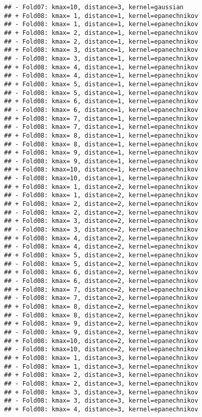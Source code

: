 \documentclass[
]{article}
\begin{document}
\begin{verbatim}
## - Fold07: kmax=10, distance=3, kernel=gaussian 
## + Fold08: kmax= 1, distance=1, kernel=epanechnikov 
## - Fold08: kmax= 1, distance=1, kernel=epanechnikov 
## + Fold08: kmax= 2, distance=1, kernel=epanechnikov 
## - Fold08: kmax= 2, distance=1, kernel=epanechnikov 
## + Fold08: kmax= 3, distance=1, kernel=epanechnikov 
## - Fold08: kmax= 3, distance=1, kernel=epanechnikov 
## + Fold08: kmax= 4, distance=1, kernel=epanechnikov 
## - Fold08: kmax= 4, distance=1, kernel=epanechnikov 
## + Fold08: kmax= 5, distance=1, kernel=epanechnikov 
## - Fold08: kmax= 5, distance=1, kernel=epanechnikov 
## + Fold08: kmax= 6, distance=1, kernel=epanechnikov 
## - Fold08: kmax= 6, distance=1, kernel=epanechnikov 
## + Fold08: kmax= 7, distance=1, kernel=epanechnikov 
## - Fold08: kmax= 7, distance=1, kernel=epanechnikov 
## + Fold08: kmax= 8, distance=1, kernel=epanechnikov 
## - Fold08: kmax= 8, distance=1, kernel=epanechnikov 
## + Fold08: kmax= 9, distance=1, kernel=epanechnikov 
## - Fold08: kmax= 9, distance=1, kernel=epanechnikov 
## + Fold08: kmax=10, distance=1, kernel=epanechnikov 
## - Fold08: kmax=10, distance=1, kernel=epanechnikov 
## + Fold08: kmax= 1, distance=2, kernel=epanechnikov 
## - Fold08: kmax= 1, distance=2, kernel=epanechnikov 
## + Fold08: kmax= 2, distance=2, kernel=epanechnikov 
## - Fold08: kmax= 2, distance=2, kernel=epanechnikov 
## + Fold08: kmax= 3, distance=2, kernel=epanechnikov 
## - Fold08: kmax= 3, distance=2, kernel=epanechnikov 
## + Fold08: kmax= 4, distance=2, kernel=epanechnikov 
## - Fold08: kmax= 4, distance=2, kernel=epanechnikov 
## + Fold08: kmax= 5, distance=2, kernel=epanechnikov 
## - Fold08: kmax= 5, distance=2, kernel=epanechnikov 
## + Fold08: kmax= 6, distance=2, kernel=epanechnikov 
## - Fold08: kmax= 6, distance=2, kernel=epanechnikov 
## + Fold08: kmax= 7, distance=2, kernel=epanechnikov 
## - Fold08: kmax= 7, distance=2, kernel=epanechnikov 
## + Fold08: kmax= 8, distance=2, kernel=epanechnikov 
## - Fold08: kmax= 8, distance=2, kernel=epanechnikov 
## + Fold08: kmax= 9, distance=2, kernel=epanechnikov 
## - Fold08: kmax= 9, distance=2, kernel=epanechnikov 
## + Fold08: kmax=10, distance=2, kernel=epanechnikov 
## - Fold08: kmax=10, distance=2, kernel=epanechnikov 
## + Fold08: kmax= 1, distance=3, kernel=epanechnikov 
## - Fold08: kmax= 1, distance=3, kernel=epanechnikov 
## + Fold08: kmax= 2, distance=3, kernel=epanechnikov 
## - Fold08: kmax= 2, distance=3, kernel=epanechnikov 
## + Fold08: kmax= 3, distance=3, kernel=epanechnikov 
## - Fold08: kmax= 3, distance=3, kernel=epanechnikov 
## + Fold08: kmax= 4, distance=3, kernel=epanechnikov 

\end{verbatim}
\end{document}
